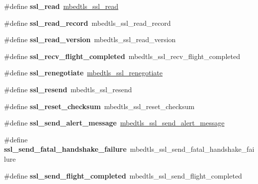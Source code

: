 \begin{DoxyCompactItemize}
\#define {\bfseries ssl\+\_\+read}~\mbox{\hyperlink{ssl_8h_aa2c29eeb1deaf5ad9f01a7515006ede5}{mbedtls\+\_\+ssl\+\_\+read}}
\item 
\mbox{\label{compat-1_83_8h_af81f465b129db3947d2ebfca931dd1f4}} 
\#define {\bfseries ssl\+\_\+read\+\_\+record}~mbedtls\+\_\+ssl\+\_\+read\+\_\+record
\item 
\mbox{\label{compat-1_83_8h_a5a530fd9e5a802238029b30f8ab7d2c8}} 
\#define {\bfseries ssl\+\_\+read\+\_\+version}~mbedtls\+\_\+ssl\+\_\+read\+\_\+version
\item 
\mbox{\label{compat-1_83_8h_a0368a3c941155088d189afef6c555a60}} 
\#define {\bfseries ssl\+\_\+recv\+\_\+flight\+\_\+completed}~mbedtls\+\_\+ssl\+\_\+recv\+\_\+flight\+\_\+completed
\item 
\mbox{\label{compat-1_83_8h_a5ab1cb88ad4ce08d9862dae7435a0348}} 
\#define {\bfseries ssl\+\_\+renegotiate}~\mbox{\hyperlink{ssl_8h_a49b7a27a616495d5f0a4fabc3f550dbb}{mbedtls\+\_\+ssl\+\_\+renegotiate}}
\item 
\mbox{\label{compat-1_83_8h_a70d8b31b1c74670701e22c3bbeffc563}} 
\#define {\bfseries ssl\+\_\+resend}~mbedtls\+\_\+ssl\+\_\+resend
\item 
\mbox{\label{compat-1_83_8h_a1b69f2a851cbe70085c7c83d7d9c43ef}} 
\#define {\bfseries ssl\+\_\+reset\+\_\+checksum}~mbedtls\+\_\+ssl\+\_\+reset\+\_\+checksum
\item 
\mbox{\label{compat-1_83_8h_a8aef4bce934b4f7b063b65c09a9e0140}} 
\#define {\bfseries ssl\+\_\+send\+\_\+alert\+\_\+message}~\mbox{\hyperlink{ssl_8h_a431e67252731a34bd9b5f2c9222f4c43}{mbedtls\+\_\+ssl\+\_\+send\+\_\+alert\+\_\+message}}
\item 
\mbox{\label{compat-1_83_8h_ac9b45a114225380f6fe489ae83b9268b}} 
\#define {\bfseries ssl\+\_\+send\+\_\+fatal\+\_\+handshake\+\_\+failure}~mbedtls\+\_\+ssl\+\_\+send\+\_\+fatal\+\_\+handshake\+\_\+failure
\item 
\mbox{\label{compat-1_83_8h_a91ce647a676397242531011de728ae05}} 
\#define {\bfseries ssl\+\_\+send\+\_\+flight\+\_\+completed}~mbedtls\+\_\+ssl\+\_\+send\+\_\+flight\+\_\+completed

\end{DoxyCompactItemize}

